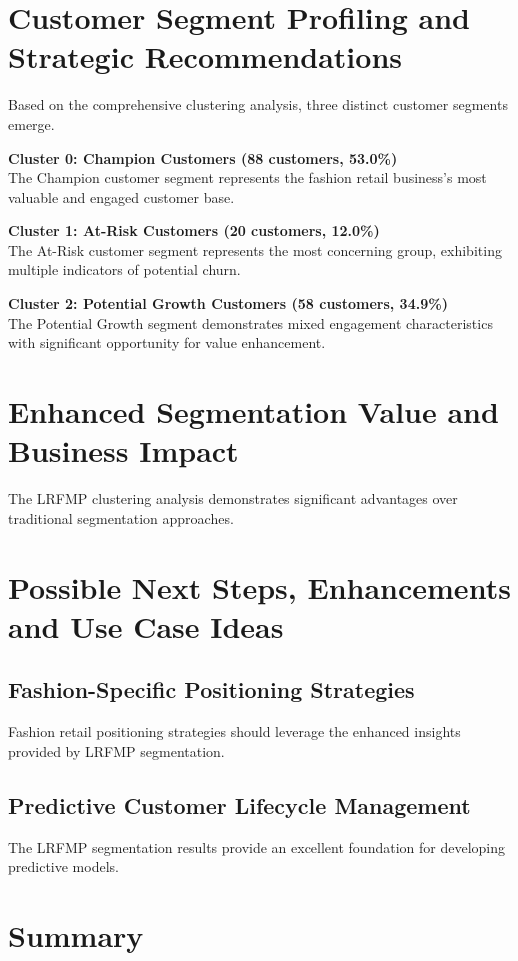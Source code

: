 \documentclass[12pt, a4paper, oneside]{report}
\begin{document}
\section{Customer Segment Profiling and Strategic Recommendations}

Based on the comprehensive clustering analysis, three distinct customer segments emerge.

\textbf{Cluster 0: Champion Customers (88 customers, 53.0\%)} \\
The Champion customer segment represents the fashion retail business's most valuable and engaged customer base.

\textbf{Cluster 1: At-Risk Customers (20 customers, 12.0\%)} \\
The At-Risk customer segment represents the most concerning group, exhibiting multiple indicators of potential churn.

\textbf{Cluster 2: Potential Growth Customers (58 customers, 34.9\%)} \\
The Potential Growth segment demonstrates mixed engagement characteristics with significant opportunity for value enhancement.


\section{Enhanced Segmentation Value and Business Impact}

The LRFMP clustering analysis demonstrates significant advantages over traditional segmentation approaches.


\section{Possible Next Steps, Enhancements and Use Case Ideas}

\subsection{Fashion-Specific Positioning Strategies}
Fashion retail positioning strategies should leverage the enhanced insights provided by LRFMP segmentation.

\subsection{Predictive Customer Lifecycle Management}
The LRFMP segmentation results provide an excellent foundation for developing predictive models.


\section{Summary}
\end{document}
